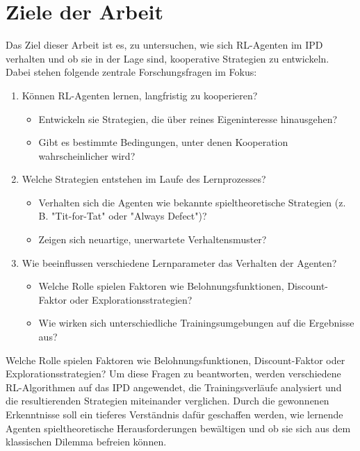 \section{Ziele der Arbeit}
Das Ziel dieser Arbeit ist es, zu untersuchen, wie sich RL-Agenten im IPD verhalten
und ob sie in der Lage sind, kooperative Strategien zu entwickeln. Dabei stehen 
folgende zentrale Forschungsfragen im Fokus:
\begin{enumerate}
    \item Können RL-Agenten lernen, langfristig zu kooperieren?
        \begin{itemize}
            \item Entwickeln sie Strategien, die über reines Eigeninteresse hinausgehen?
            \item Gibt es bestimmte Bedingungen, unter denen Kooperation wahrscheinlicher wird?
        \end{itemize}
    \item Welche Strategien entstehen im Laufe des Lernprozesses?
        \begin{itemize}
            \item Verhalten sich die Agenten wie bekannte spieltheoretische Strategien (z. B. "Tit-for-Tat" oder "Always Defect")?
            \item Zeigen sich neuartige, unerwartete Verhaltensmuster?
        \end{itemize}
    \item Wie beeinflussen verschiedene Lernparameter das Verhalten der Agenten?
        \begin{itemize}
            \item Welche Rolle spielen Faktoren wie Belohnungsfunktionen, Discount-Faktor oder Explorationsstrategien?
            \item Wie wirken sich unterschiedliche Trainingsumgebungen auf die Ergebnisse aus?
        \end{itemize}
\end{enumerate}
Welche Rolle spielen Faktoren wie Belohnungsfunktionen, Discount-Faktor oder Explorationsstrategien?
Um diese Fragen zu beantworten, werden verschiedene RL-Algorithmen auf das IPD angewendet, die Trainingsverläufe analysiert und die resultierenden Strategien miteinander verglichen. Durch die gewonnenen Erkenntnisse soll ein tieferes Verständnis dafür geschaffen werden, wie lernende Agenten spieltheoretische Herausforderungen bewältigen und ob sie sich aus dem klassischen Dilemma befreien können.